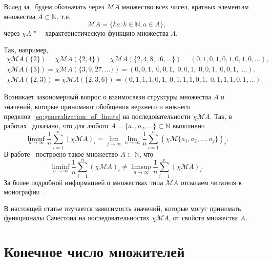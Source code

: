 \documentclass[a4paper,openbib]{article}
\theoremstyle{definition}
\begin{document}
Вслед за~\cite{hall1992behrend} будем обозначать через $\mathscr{M}A$ множество всех чисел,
кратных элементам множества $A\subset\mathbb{N}$, т.е.
\begin{equation}
	\mathscr{M}A = \{ka: k\in\mathbb{N}, a\in A\}
	,
\end{equation}
через $\chi A$ "--- характеристическую функцию множества $A$.

Так, например,
\begin{gather}
	\chi \mathscr{M}\!A(\{2\}) = \chi \mathscr{M}\!A(\{2, 4\}) = \chi \mathscr{M}\!A(\{2,4,8,16,...\})
	= (0,1,0,1,0,1,0,1,0,...),
\\
	\chi \mathscr{M}\!A(\{3\}) = \chi \mathscr{M}\!A(\{3,9,27,...\}) = (0,0,1,\;0,0,1,\;0,0,1,\;0,0,1,\;0,0,1,\;...),
\\
	\chi \mathscr{M}\!A(\{2,3\}) = \chi \mathscr{M}\!A(\{2,3,6\}) = (0,1,1,1,0,1,\;0,1,1,1,0,1,\;0,1,1,1,0,1,...).
\end{gather}

Возникает закономерный вопрос о взаимосвязи структуры множества $A$
и значений, которые принимают обобщения верхнего и нижнего пределов~\eqref{eq:generalization_of_limits}
на последовательности $\chi \mathscr{M}\!A$.
Так, в работах~\cite{davenport1936sequences,davenport1951sequences} доказано, что для любого
$A=\{a_1,a_2,...\}\subset\mathbb{N}$
выполнено
\begin{equation}
	\liminf_{n\to\infty}\frac1{n}\sum_{i=1}^n (\chi\mathscr{M}A)_i =
	\lim_{j\to\infty}\lim_{n\to\infty}\frac1{n}\sum_{i=1}^n (\chi\mathscr{M}\{a_1,a_2,...,a_j\})_i
	.
\end{equation}
В работе~\cite[\S 7]{besicovitch1935density} построено такое множество $A\subset\mathbb{N}$, что
\begin{equation}
	\liminf_{n\to\infty}\frac1{n}\sum_{i=1}^n (\chi\mathscr{M}A)_i \neq
	\limsup_{n\to\infty}\frac1{n}\sum_{i=1}^n (\chi\mathscr{M}A)_i
	.
\end{equation}
За более подробной информацией о множествах типа $\mathscr{M}A$ отсылаем читателя к монографии~\cite{hall1996multiples}.

В настоящей статье изучается зависимость значений, которые могут принимать функционалы Сачестона
на последовательностях $\chi\mathscr{M}A$, от свойств множества $A$.





\section{Конечное число множителей}
\end{document}
